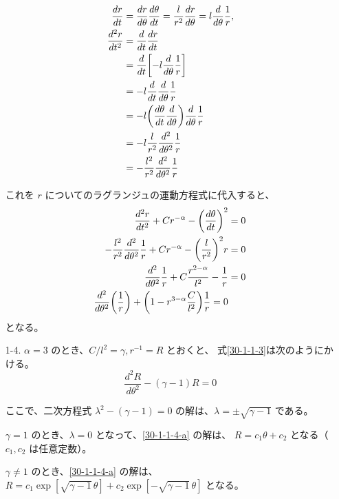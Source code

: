 \documentclass[report]{dennou777}
\begin{document}
\begin{itemize}
		\begin{align*}
			\frac{dr}{dt}&=\frac{dr}{d\theta}\frac{d\theta}{dt}
				=\frac{l}{r^2}\frac{dr}{d\theta}
				=l\frac{d}{d\theta}\frac{1}{r},\\
			\frac{d^2r}{dt^2}&=\frac{d}{dt}\frac{dr}{dt}\\
			&=\frac{d}{dt}\mleft[-l\frac{d}{d\theta}\frac{1}{r}\mright]\\
			&=-l\frac{d}{dt}\frac{d}{d\theta}\frac{1}{r}\\
			&=-l\mleft(\frac{d\theta}{dt}\frac{d}{d\theta}\mright)\frac{d}{d\theta}\frac{1}{r}\\
			&=-l\frac{l}{r^2}\frac{d^2}{d\theta^2}\frac{1}{r}\\
			&=-\frac{l^2}{r^2}\frac{d^2}{d\theta^2}\frac{1}{r}
		\end{align*}

		これを $r$ についてのラグランジュの運動方程式に代入すると、
		\begin{align}
			\frac{d^2r}{dt^2}+Cr^{-\alpha}-\mleft(\frac{d\theta}{dt}\mright)^2&=0\notag\\
			-\frac{l^2}{r^2}\frac{d^2}{d\theta^2}\frac{1}{r}+Cr^{-\alpha}
				-\mleft(\frac{l}{r^2}\mright)^2r&=0\notag\\
			\frac{d^2}{d\theta^2}\frac{1}{r}+C\frac{r^{2-\alpha}}{l^2}-\frac{1}{r}&=0\notag\\
			\frac{d^2}{d\theta^2}\mleft(\frac{1}{r}\mright)+
				\mleft(1-r^{3-\alpha}\frac{C}{l^2}\mright)\frac{1}{r}=0\label{30-1-1-3}
		\end{align}
		となる。
	\item[1-4.]
		$\alpha=3$ のとき、$C/l^2=\gamma, r^{-1}=R$ とおくと、
		式\eqref{30-1-1-3}は次のようにかける。
		\begin{equation}
			\frac{d^2R}{d\theta^2}-(\gamma-1)R=0\label{30-1-1-4-a}
		\end{equation}

		ここで、二次方程式 $\lambda^2-(\gamma-1)=0$ の解は、$\lambda=\pm\sqrt{\gamma-1}$
		である。

		$\gamma=1$ のとき、$\lambda=0$ となって、\eqref{30-1-1-4-a} の解は、
		$R=c_1\theta+c_2$ となる（$c_1, c_2$ は任意定数）。

		$\gamma\neq1$ のとき、\eqref{30-1-1-4-a} の解は、
		$R=c_1\exp[\sqrt{\gamma-1}\,\theta]+c_2\exp[-\sqrt{\gamma-1}\,\theta]$
		となる。


\end{itemize}
\end{document}
